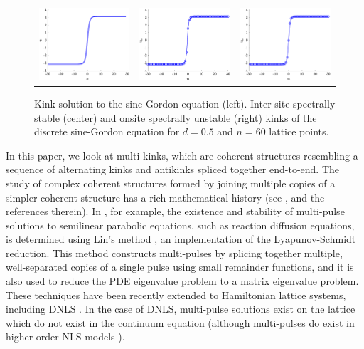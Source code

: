 \documentclass[12pt,reqno]{amsart}
\begin{document}
\begin{figure}
	\begin{center}
	\begin{tabular}{ccc}
	\includegraphics[width=5cm]{contSGkink.eps}	&
	\includegraphics[width=5cm]{1kinkintersite.eps} &
	\includegraphics[width=5cm]{1kinkonsite.eps}
	\end{tabular}
	\end{center}
	\caption{Kink solution to the sine-Gordon equation (left). Inter-site spectrally stable (center) and onsite 
	spectrally unstable (right) kinks of the discrete sine-Gordon equation for $d = 0.5$ and $n=60$ lattice points. }
	\label{fig:SGkinks}
\end{figure}


In this paper, we look at multi-kinks, which are coherent structures resembling a sequence of alternating kinks and antikinks spliced together end-to-end. 
The study of complex coherent structures formed by joining multiple copies of a simpler coherent structure has a rich mathematical history (see \cite{Sandstede1998}, and the references therein). In \cite{Sandstede1998}, for example, the existence and stability of multi-pulse solutions to semilinear parabolic equations, such as reaction diffusion equations, is determined using Lin's method \cites{Lin1990,Lin2008}, an implementation of the Lyapunov-Schmidt reduction. This method constructs multi-pulses by splicing together multiple, well-separated copies of a single pulse using small remainder functions, and it is also used to reduce the PDE eigenvalue problem to a matrix eigenvalue problem. These techniques have been recently extended to Hamiltonian lattice systems, including DNLS \cite{Parker2020}. In the case of DNLS, multi-pulse solutions exist on the lattice which do not exist in the continuum equation (although multi-pulses do exist in higher order NLS models \cite{Parker2021}). 
\end{document}

